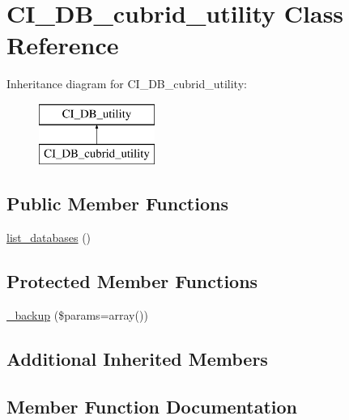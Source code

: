 \hypertarget{class_c_i___d_b__cubrid__utility}{}\section{C\+I\+\_\+\+D\+B\+\_\+cubrid\+\_\+utility Class Reference}
\label{class_c_i___d_b__cubrid__utility}
Inheritance diagram for C\+I\+\_\+\+D\+B\+\_\+cubrid\+\_\+utility\+:\begin{figure}[H]
\begin{center}
\leavevmode
\includegraphics[height=2.000000cm]{class_c_i___d_b__cubrid__utility}
\end{center}
\end{figure}
\subsection*{Public Member Functions}
\begin{DoxyCompactItemize}
\item 
\mbox{\hyperlink{class_c_i___d_b__cubrid__utility_a8a161268666efd6cd7a1147ca731ed36}{list\+\_\+databases}} ()
\end{DoxyCompactItemize}
\subsection*{Protected Member Functions}
\begin{DoxyCompactItemize}
\item 
\mbox{\hyperlink{class_c_i___d_b__cubrid__utility_a6824d3bf7f08da77ce107da21f9f2da6}{\+\_\+backup}} (\$params=array())
\end{DoxyCompactItemize}
\subsection*{Additional Inherited Members}


\subsection{Member Function Documentation}
\mbox{\label{class_c_i___d_b__cubrid__utility_a6824d3bf7f08da77ce107da21f9f2da6}} 
